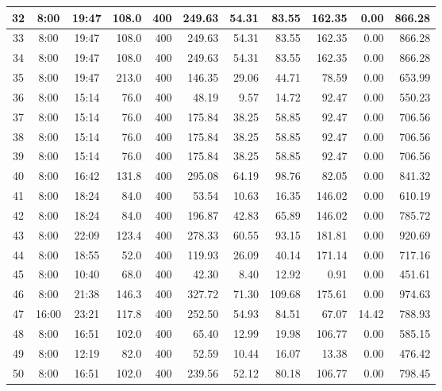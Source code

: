 \begin{landscape}
\begin{longtable}{|c|c|c|r|r|r|r|r|r|r|r|}
\hline
32 & 8:00 & 19:47 & 108.0 & 400 & 249.63 & 54.31 & 83.55 & 162.35 & 0.00 & 866.28 \\
\hline
\rowcolor{gray!8}
33 & 8:00 & 19:47 & 108.0 & 400 & 249.63 & 54.31 & 83.55 & 162.35 & 0.00 & 866.28 \\
\hline
34 & 8:00 & 19:47 & 108.0 & 400 & 249.63 & 54.31 & 83.55 & 162.35 & 0.00 & 866.28 \\
\hline
\rowcolor{gray!8}
35 & 8:00 & 19:47 & 213.0 & 400 & 146.35 & 29.06 & 44.71 & 78.59 & 0.00 & 653.99 \\
\hline
36 & 8:00 & 15:14 & 76.0 & 400 & 48.19 & 9.57 & 14.72 & 92.47 & 0.00 & 550.23 \\
\hline
\rowcolor{gray!8}
37 & 8:00 & 15:14 & 76.0 & 400 & 175.84 & 38.25 & 58.85 & 92.47 & 0.00 & 706.56 \\
\hline
38 & 8:00 & 15:14 & 76.0 & 400 & 175.84 & 38.25 & 58.85 & 92.47 & 0.00 & 706.56 \\
\hline
\rowcolor{gray!8}
39 & 8:00 & 15:14 & 76.0 & 400 & 175.84 & 38.25 & 58.85 & 92.47 & 0.00 & 706.56 \\
\hline
40 & 8:00 & 16:42 & 131.8 & 400 & 295.08 & 64.19 & 98.76 & 82.05 & 0.00 & 841.32 \\
\hline
\rowcolor{gray!8}
41 & 8:00 & 18:24 & 84.0 & 400 & 53.54 & 10.63 & 16.35 & 146.02 & 0.00 & 610.19 \\
\hline
42 & 8:00 & 18:24 & 84.0 & 400 & 196.87 & 42.83 & 65.89 & 146.02 & 0.00 & 785.72 \\
\hline
\rowcolor{gray!8}
43 & 8:00 & 22:09 & 123.4 & 400 & 278.33 & 60.55 & 93.15 & 181.81 & 0.00 & 920.69 \\
\hline
44 & 8:00 & 18:55 & 52.0 & 400 & 119.93 & 26.09 & 40.14 & 171.14 & 0.00 & 717.16 \\
\hline
\rowcolor{gray!8}
45 & 8:00 & 10:40 & 68.0 & 400 & 42.30 & 8.40 & 12.92 & 0.91 & 0.00 & 451.61 \\
\hline
46 & 8:00 & 21:38 & 146.3 & 400 & 327.72 & 71.30 & 109.68 & 175.61 & 0.00 & 974.63 \\
\hline
\rowcolor{gray!8}
47 & 16:00 & 23:21 & 117.8 & 400 & 252.50 & 54.93 & 84.51 & 67.07 & 14.42 & 788.93 \\
\hline
48 & 8:00 & 16:51 & 102.0 & 400 & 65.40 & 12.99 & 19.98 & 106.77 & 0.00 & 585.15 \\
\hline
\rowcolor{gray!8}
49 & 8:00 & 12:19 & 82.0 & 400 & 52.59 & 10.44 & 16.07 & 13.38 & 0.00 & 476.42 \\
\hline
50 & 8:00 & 16:51 & 102.0 & 400 & 239.56 & 52.12 & 80.18 & 106.77 & 0.00 & 798.45 \\

\end{longtable}
\end{landscape}
